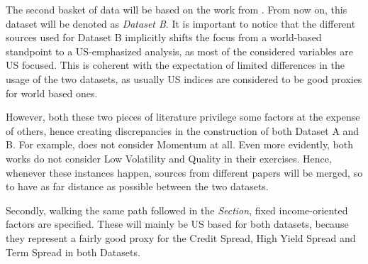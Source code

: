 \documentclass[12pt]{article}
\begin{document}
The second basket of data will be based on the work from . From now on, this dataset will be denoted as \textit{Dataset B}. It is important to notice that the different sources used for Dataset B implicitly shifts the focus from a world-based standpoint to a US-emphasized analysis, as most of the considered variables are US focused. This is coherent with the expectation of limited differences in the usage of the two datasets, as usually US indices are considered to be good proxies for world based ones.

However, both these two pieces of literature privilege some factors at the expense of others, hence creating discrepancies in the construction of both Dataset A and B. For example,  does not consider Momentum at all. Even more evidently, both works do not consider Low Volatility and Quality in their exercises. Hence, whenever these instances happen, sources from different papers will be merged, so to have as far distance as possible between the two datasets.

Secondly, walking the same path followed in the \textit{ Section}, fixed income-oriented factors are specified. These will mainly be US based for both datasets, because they represent a fairly good proxy for the Credit Spread, High Yield Spread and Term Spread in both Datasets.
\end{document}
